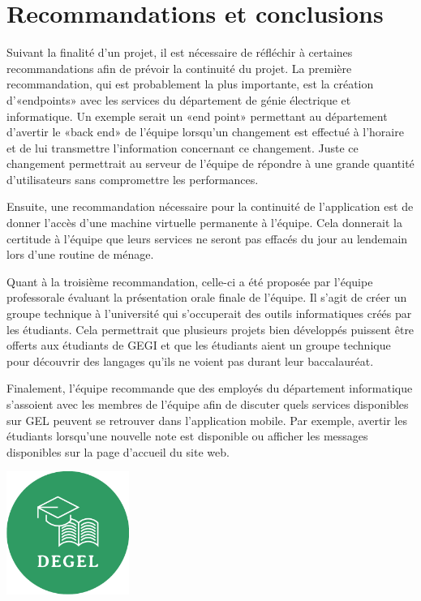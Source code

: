 \section{Recommandations et conclusions}
Suivant la finalité d'un projet, il est nécessaire de réfléchir à certaines recommandations afin de prévoir la continuité du projet. La première recommandation, qui est probablement la plus importante, est la création d'«endpoints» avec les services du département de génie électrique et informatique. Un exemple serait un «end point» permettant au département d'avertir le «back end» de l'équipe lorsqu'un changement est effectué à l'horaire et de lui transmettre l'information concernant ce changement. Juste ce changement permettrait au serveur de l'équipe de répondre à une grande quantité d'utilisateurs sans compromettre les performances.

Ensuite, une recommandation nécessaire pour la continuité de l'application est de donner l'accès d'une machine virtuelle permanente à l'équipe. Cela donnerait la certitude à l'équipe que leurs services ne seront pas effacés du jour au lendemain lors d'une routine de ménage.

Quant à la troisième recommandation, celle-ci a été proposée par l'équipe professorale évaluant la présentation orale finale de l'équipe. Il s'agit de créer un groupe technique à l'université qui s'occuperait des outils informatiques créés par les étudiants. Cela permettrait que plusieurs projets bien développés puissent être offerts aux étudiants de GEGI et que les étudiants aient un groupe technique pour découvrir des langages qu'ils ne voient pas durant leur baccalauréat.

Finalement, l'équipe recommande que des employés du département informatique s'assoient avec les membres de l'équipe afin de discuter quels services disponibles sur GEL peuvent se retrouver dans l'application mobile. Par exemple, avertir les étudiants lorsqu'une nouvelle note est disponible ou afficher les messages disponibles sur la page d'accueil du site web.

\vfill

{%
\centering%
\includegraphics[width=0.3\textwidth]{Figures/logo}%
\par%
}

\vfill
